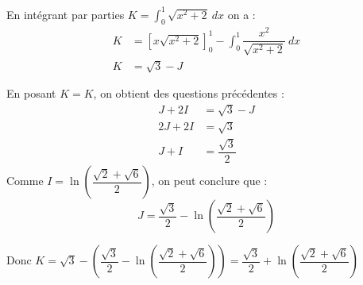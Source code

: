 \documentclass[12pt, openany]{book}
\begin{document}
	En intégrant par parties $K=\displaystyle{\int_{0}^{1}\sqrt{x^2+2}\ dx}$ on a :
	\begin{align}
		K&=\displaystyle{\left[x\sqrt{x^2+2}\right]_0^1 - \int_{0}^{1}\dfrac{x^2}{\sqrt{x^2+2}}\ dx}\\
		K&=\sqrt{3}-J
	\end{align}
	
	En posant $K=K$, on obtient des questions précédentes : 
	\begin{align}
		J+2I&=\sqrt{3}-J\\
		2J+2I&=\sqrt{3}\\
		J+I&=\dfrac{\sqrt{3}}{2}
	\end{align}
	Comme $I=\ln\left(\dfrac{\sqrt{2}+\sqrt{6}}{2}\right)$, on peut conclure que :
	$$J=\dfrac{\sqrt{3}}{2}-\ln\left(\dfrac{\sqrt{2}+\sqrt{6}}{2}\right)$$
	
	Donc $K=\sqrt{3}-\left(\dfrac{\sqrt{3}}{2}-\ln\left(\dfrac{\sqrt{2}+\sqrt{6}}{2}\right)\right)=\dfrac{\sqrt{3}}{2}+\ln\left(\dfrac{\sqrt{2}+\sqrt{6}}{2}\right)$
	
\end{document}
